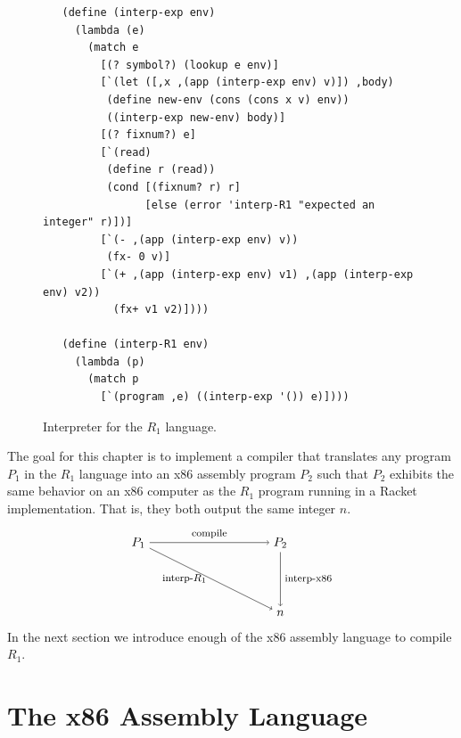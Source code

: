 \documentclass[11pt]{book}
\begin{document}
\begin{figure}[tbp]
\begin{lstlisting}
   (define (interp-exp env)
     (lambda (e)
       (match e
         [(? symbol?) (lookup e env)]
         [`(let ([,x ,(app (interp-exp env) v)]) ,body)
          (define new-env (cons (cons x v) env))
          ((interp-exp new-env) body)]
         [(? fixnum?) e]
         [`(read)
          (define r (read))
          (cond [(fixnum? r) r]
                [else (error 'interp-R1 "expected an integer" r)])]
         [`(- ,(app (interp-exp env) v))
          (fx- 0 v)]
         [`(+ ,(app (interp-exp env) v1) ,(app (interp-exp env) v2))
           (fx+ v1 v2)])))

   (define (interp-R1 env)
     (lambda (p)
       (match p
         [`(program ,e) ((interp-exp '()) e)])))
\end{lstlisting}
\caption{Interpreter for the $R_1$ language.}
\label{fig:interp-R1}
\end{figure}

The goal for this chapter is to implement a compiler that translates
any program $P_1$ in the $R_1$ language into an x86 assembly
program $P_2$ such that $P_2$ exhibits the same behavior on an x86
computer as the $R_1$ program running in a Racket implementation.
That is, they both output the same integer $n$.
\[
\begin{tikzpicture}[baseline=(current  bounding  box.center)]
 \node (p1) at (0,  0)   {$P_1$};
 \node (p2) at (4,  0)   {$P_2$};
 \node (o)  at (4, -2) {$n$};

 \path[->] (p1) edge [above] node {\footnotesize compile} (p2);
 \path[->] (p1) edge [left]  node {\footnotesize interp-$R_1$} (o);
 \path[->] (p2) edge [right] node {\footnotesize interp-x86} (o);
\end{tikzpicture}
\]
In the next section we introduce enough of the x86 assembly
language to compile $R_1$.

\section{The x86 Assembly Language}
\label{sec:x86}
\end{document}
